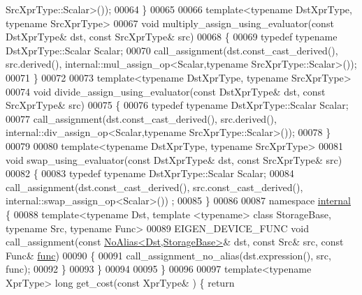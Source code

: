 \begin{DoxyCode}
       SrcXprType::Scalar>());
00064   \}
00065 
00066   \textcolor{keyword}{template}<\textcolor{keyword}{typename} DstXprType, \textcolor{keyword}{typename} SrcXprType>
00067   \textcolor{keywordtype}{void} multiply\_assign\_using\_evaluator(\textcolor{keyword}{const} DstXprType& dst, \textcolor{keyword}{const} SrcXprType& src)
00068   \{
00069     \textcolor{keyword}{typedef} \textcolor{keyword}{typename} DstXprType::Scalar Scalar;
00070     call\_assignment(dst.const\_cast\_derived(), src.derived(), internal::mul\_assign\_op<Scalar,typename
       SrcXprType::Scalar>());
00071   \}
00072 
00073   \textcolor{keyword}{template}<\textcolor{keyword}{typename} DstXprType, \textcolor{keyword}{typename} SrcXprType>
00074   \textcolor{keywordtype}{void} divide\_assign\_using\_evaluator(\textcolor{keyword}{const} DstXprType& dst, \textcolor{keyword}{const} SrcXprType& src)
00075   \{
00076     \textcolor{keyword}{typedef} \textcolor{keyword}{typename} DstXprType::Scalar Scalar;
00077     call\_assignment(dst.const\_cast\_derived(), src.derived(), internal::div\_assign\_op<Scalar,typename
       SrcXprType::Scalar>());
00078   \}
00079   
00080   \textcolor{keyword}{template}<\textcolor{keyword}{typename} DstXprType, \textcolor{keyword}{typename} SrcXprType>
00081   \textcolor{keywordtype}{void} swap\_using\_evaluator(\textcolor{keyword}{const} DstXprType& dst, \textcolor{keyword}{const} SrcXprType& src)
00082   \{
00083     \textcolor{keyword}{typedef} \textcolor{keyword}{typename} DstXprType::Scalar Scalar;
00084     call\_assignment(dst.const\_cast\_derived(), src.const\_cast\_derived(), internal::swap\_assign\_op<Scalar>())
      ;
00085   \}
00086 
00087   \textcolor{keyword}{namespace }\hyperlink{namespaceinternal}{internal} \{
00088     \textcolor{keyword}{template}<\textcolor{keyword}{typename} Dst, \textcolor{keyword}{template} <\textcolor{keyword}{typename}> \textcolor{keyword}{class }StorageBase, \textcolor{keyword}{typename} Src, \textcolor{keyword}{typename} Func>
00089     EIGEN\_DEVICE\_FUNC \textcolor{keywordtype}{void} call\_assignment(\textcolor{keyword}{const} \hyperlink{group___core___module_class_eigen_1_1_no_alias}{NoAlias<Dst,StorageBase>}& dst, \textcolor{keyword}{
      const} Src& src, \textcolor{keyword}{const} Func& \hyperlink{structfunc}{func})
00090     \{
00091       call\_assignment\_no\_alias(dst.expression(), src, func);
00092     \}
00093   \}
00094   
00095 \}
00096 
00097 \textcolor{keyword}{template}<\textcolor{keyword}{typename} XprType> \textcolor{keywordtype}{long} get\_cost(\textcolor{keyword}{const} XprType& ) \{ \textcolor{keywordflow}{return} 

\end{DoxyCode}
